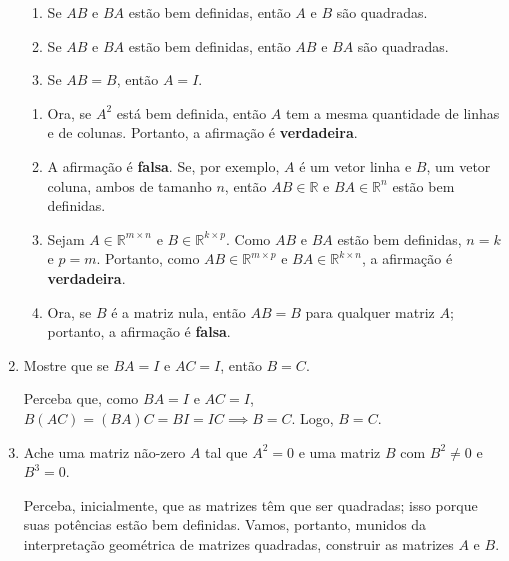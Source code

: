 \documentclass[leqno]{article}
\begin{document}
\begin{enumerate}
\begin{enumerate}
\item Se $AB$ e $BA$ estão bem definidas, então $A$ e $B$ são quadradas.

\item Se $AB$ e $BA$ estão bem definidas, então $AB$ e $BA$ são quadradas.

\item Se $AB = B$, então $A = I$.

\end{enumerate}

\begin{sol} 
	\begin{enumerate} 
		\item Ora, se $A^2$ está bem definida, então $A$ tem a mesma quantidade de linhas e de colunas. Portanto, a afirmação é \textbf{verdadeira}.  

		\item A afirmação é \textbf{falsa}. Se, por exemplo, $A$ é um vetor linha e $B$, um vetor coluna, ambos de tamanho $n$, então $AB \in \mathbb{R}$ e $BA \in \mathbb{R}^{n}$ estão bem definidas. 

		\item Sejam $A \in \mathbb{R}^{m \times n}$ e $B \in \mathbb{R}^{k \times p}$. Como $AB$ e $BA$ estão bem definidas, $n = k$ e $p = m$. Portanto, como $AB \in \mathbb{R}^{m \times p}$ e $BA \in \mathbb{R}^{k \times n}$, a afirmação é \textbf{verdadeira}.  

		\item Ora, se $B$ é a matriz nula, então $AB = B$ para qualquer matriz $A$; portanto, a afirmação é \textbf{falsa}.   
	\end{enumerate} 
\end{sol} 

\item Mostre que se $BA = I$ e $AC = I$, então $B=C$.

\begin{sol} 
	Perceba que, como $BA = I$ e $AC = I$, $B(AC) = (BA)C = BI = IC \implies B = C$. Logo, $B = C$.   
\end{sol} 

\item Ache uma matriz não-zero $A$ tal que $A^2 = 0$ e uma matriz $B$ com $B^2 \neq 0$ e $B^3 = 0$.

\begin{sol} 
	Perceba, inicialmente, que as matrizes têm que ser quadradas; isso porque suas potências estão bem definidas. Vamos, portanto, munidos da interpretação geométrica de matrizes quadradas, construir as matrizes $A$ e $B$. 


\end{sol}
\end{enumerate}
\end{document}
